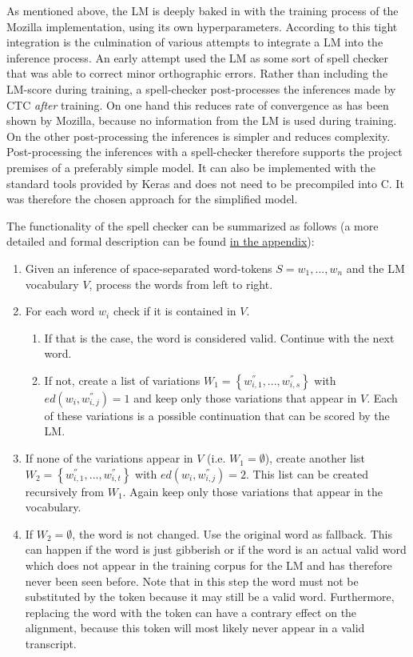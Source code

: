 As mentioned above, the \ac{LM} is deeply baked in with the training process of the Mozilla implementation, using its own hyperparameters. According to \cite{mozillajourney} this tight integration is the culmination of various attempts to integrate a \ac{LM} into the inference process. An early attempt used the \ac{LM} as some sort of spell checker that was able to correct minor orthographic errors. Rather than including the \ac{LM}-score during training, a spell-checker post-processes the inferences made by \ac{CTC} \textit{after} training. On one hand this reduces rate of convergence as has been shown by Mozilla, because no information from the \ac{LM} is used during training. On the other post-processing the inferences is simpler and reduces complexity. Post-processing the inferences with a spell-checker therefore supports the project premises of a preferably simple model. It can also be implemented with the standard tools provided by Keras and does not need to be precompiled into C. It was therefore the chosen approach for the simplified model.

The functionality of the spell checker can be summarized as follows (a more detailed and formal description can be found \hyperref[spellchecker]{in the appendix}): 

\begin{enumerate}
	\item Given an inference of space-separated word-tokens $S = w_1, ..., w_n$ and the \ac{LM} vocabulary $V$, process the words from left to right.
	\item For each word $w_i$ check if it is contained in $V$. 
	\begin{enumerate}
		\item If that is the case, the word is considered valid. Continue with the next word. 
		\item If not, create a list of variations $W_1 = \left\{ w_{i,1}^{''}, ..., w_{i,s}^{''} \right\}$ with $ed(w_i, w_{i,j}^{''}) = 1$ and keep only those variations that appear in $V$. Each of these variations is a possible continuation that can be scored by the \ac{LM}. 
	\end{enumerate}
	\item If none of the variations appear in $V$ (i.e. $W_1 = \emptyset$), create another list $W_2 = \left\{ w_{i,1}^{''}, ..., w_{i, t}^{''} \right\}$ with $ed(w_i, w_{i,j}^{''}) = 2$. This list can be created recursively from $W_1$. Again keep only those variations that appear in the vocabulary.	
	\item If $W_2 = \emptyset$, the word is not changed. Use the original word as fallback. This can happen if the word is just gibberish or if the word is an actual valid word which does not appear in the training corpus for the \ac{LM} and has therefore never been seen before. Note that in this step the word must not be substituted by the  token because it may still be a valid word. Furthermore, replacing the word with the  token can have a contrary effect on the alignment, because this token will most likely never appear in a valid transcript. 
\end{enumerate}

